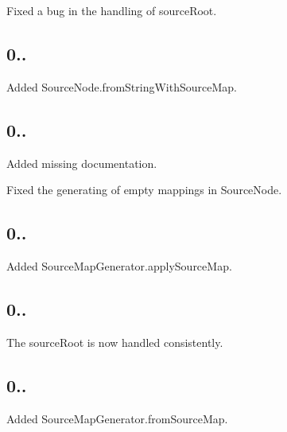 \begin{DoxyItemize}
\item Fixed a bug in the handling of source\+Root.
\end{DoxyItemize}

\subsection*{0..}


\begin{DoxyItemize}
\item Added Source\+Node.\+from\+String\+With\+Source\+Map.
\end{DoxyItemize}

\subsection*{0..}


\begin{DoxyItemize}
\item Added missing documentation.
\item Fixed the generating of empty mappings in Source\+Node.
\end{DoxyItemize}

\subsection*{0..}


\begin{DoxyItemize}
\item Added Source\+Map\+Generator.\+apply\+Source\+Map.
\end{DoxyItemize}

\subsection*{0..}


\begin{DoxyItemize}
\item The source\+Root is now handled consistently.
\end{DoxyItemize}

\subsection*{0..}


\begin{DoxyItemize}
\item Added Source\+Map\+Generator.\+from\+Source\+Map.
\end{DoxyItemize}


